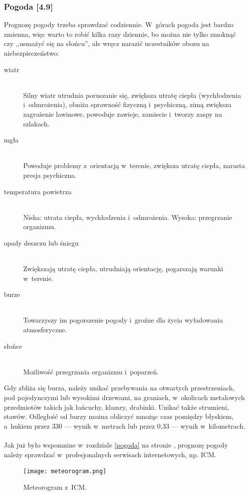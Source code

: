 \documentclass[a5paper,10pt,titlepage,twoside]{article}
\begin{document}
\subsubsection{Pogoda [4.9] \label{pogoda2}}
Prognozę pogody trzeba sprawdzać codziennie. W~górach pogoda jest bardzo zmienna, więc warto to robić kilka razy dziennie, bo można nie tylko zmoknąć czy ,,usmażyć się na słońcu'', ale wręcz narazić uczestników obozu na niebezpieczeństwo:
\begin{description}
\item[wiatr] \hfill \\ Silny wiatr utrudnia poruszanie się, zwiększa utratę ciepła (wychłodzenia i~odmrożenia), obniża sprawność fizyczną i~psychiczną, zimą zwiększa zagrożenie lawinowe, powoduje zawieje, zamiecie i~tworzy zaspy na szlakach.
\item[mgła] \hfill \\ Powoduje problemy z~orientacją w~terenie, zwiększa utratę ciepła, narasta presja psychiczna.
\item[temperatura powietrza] \hfill \\ Niska: utrata ciepła, wychłodzenia i~odmrożenia. Wysoka: przegrzanie organizmu.
\item[opady deszczu lub śniegu] \hfill \\ Zwiększają utratę ciepła, utrudniają orientację, pogarszają warunki w~terenie.
\item[burze] \hfill \\ Towarzyszy im pogorszenie pogody i~groźne dla życia wyładowania atmosferyczne.
\item[słońce] \hfill \\ Możliwość przegrzania organizmu i~poparzeń.
\end{description}
Gdy zbliża się burza, należy unikać przebywania na otwartych przestrzeniach, pod pojedynczymi lub wysokimi drzewami, na graniach, w~okolicach metalowych przedmiotów takich jak łańcuchy, klamry, drabinki. Unikać także strumieni, stawów. Odległość od burzy można obliczyć mnożąc czas pomiędzy błyskiem, a~hukiem przez 330 --- wynik w~metrach lub przez 0,33 --- wynik w~kilometrach.
\\
\\
Jak już było wspomnine w~rozdziale \ref{pogoda} na stronie \pageref{pogoda}, prognozę pogody należy sprawdzać w~profesjonalnych serwisach internetowych, np. ICM.
\begin{figure}[htp]
\centering
\texttt{[image: meteorogram.png]}
\caption{Meteorogram z~ICM.}\label{fig:meteorogram}
\end{figure}
\end{document}
